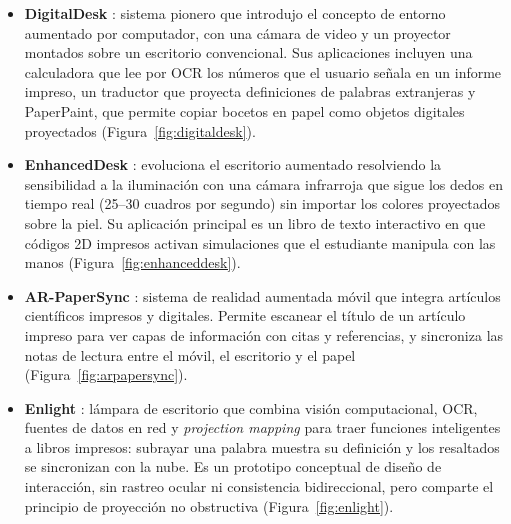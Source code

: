 \begin{itemize}
  \item \textbf{DigitalDesk} \citep{wellner1993}: sistema pionero que introdujo el concepto de entorno aumentado por computador, con una cámara de video y un proyector montados sobre un escritorio convencional. Sus aplicaciones incluyen una calculadora que lee por OCR los números que el usuario señala en un informe impreso, un traductor que proyecta definiciones de palabras extranjeras y PaperPaint, que permite copiar bocetos en papel como objetos digitales proyectados (Figura~\ref{fig:digitaldesk}).
  \item \textbf{EnhancedDesk} \citep{koike2001}: evoluciona el escritorio aumentado resolviendo la sensibilidad a la iluminación con una cámara infrarroja que sigue los dedos en tiempo real (25--30 cuadros por segundo) sin importar los colores proyectados sobre la piel. Su aplicación principal es un libro de texto interactivo en que códigos 2D impresos activan simulaciones que el estudiante manipula con las manos (Figura~\ref{fig:enhanceddesk}).
  \item \textbf{AR-PaperSync} \citep{miah2024}: sistema de realidad aumentada móvil que integra artículos científicos impresos y digitales. Permite escanear el título de un artículo impreso para ver capas de información con citas y referencias, y sincroniza las notas de lectura entre el móvil, el escritorio y el papel (Figura~\ref{fig:arpapersync}).
  \item \textbf{Enlight} \citep{wander_enlight}: lámpara de escritorio que combina visión computacional, OCR, fuentes de datos en red y \textit{projection mapping} para traer funciones inteligentes a libros impresos: subrayar una palabra muestra su definición y los resaltados se sincronizan con la nube. Es un prototipo conceptual de diseño de interacción, sin rastreo ocular ni consistencia bidireccional, pero comparte el principio de proyección no obstructiva (Figura~\ref{fig:enlight}).
\end{itemize}

